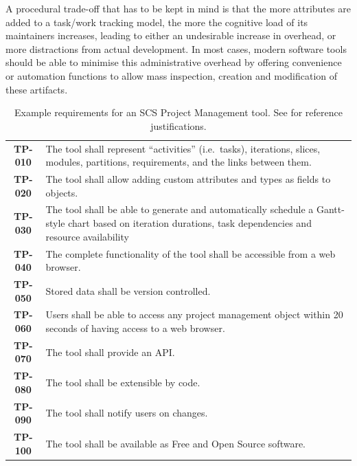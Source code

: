 \documentclass[a4paper,nobib,justified,final]{tufte-book}
\begin{document}
A procedural trade-off that has to be kept in mind  is that the more attributes are added to a task/work tracking model, the more the cognitive load of its maintainers increases, leading to either an undesirable increase in overhead, or more distractions from actual development. In most cases, modern software tools should be able to minimise this administrative overhead by offering convenience or automation functions to allow mass inspection, creation and modification of these artifacts.

\begin{invisible}
\begin{table}[h]
	\footnotesize
	\def\arraystretch{1.05}
	\begin{tabularx}{\textwidth}{cX}
		\toprule
		\textbf{TP-010} & The tool shall represent ``activities'' (i.e.\ tasks), iterations, slices, modules, partitions, requirements, and the links between them.\\
		\textbf{TP-020} & The tool shall allow adding custom attributes and types as fields to objects. \\
		\textbf{TP-030} & The tool shall be able to generate and automatically schedule a Gantt-style chart based on iteration durations, task dependencies and resource availability \\
		\textbf{TP-040} & The complete functionality of the tool shall be accessible from a web browser. \\
		\textbf{TP-050} & Stored data shall be version controlled. \\
		\textbf{TP-060} & Users shall be able to access any project management object within 20 seconds of having access to a web browser. \\
		\textbf{TP-070} & The tool shall provide an \acf{API}. \\
		\textbf{TP-080} & The tool shall be extensible by code. \\
		\textbf{TP-090} & The tool shall notify users on changes. \\
		\textbf{TP-100} & The tool shall be available as Free and Open Source software.
		\\ \bottomrule
	\end{tabularx}
	\caption[Example requirements for an SCS Project Management tool]{Example requirements for an \acs{SCS} Project Management tool. See  for reference justifications.}
	\label{tab:m_work_package_tool_requirements}
\end{table}

\end{invisible}
\end{document}
